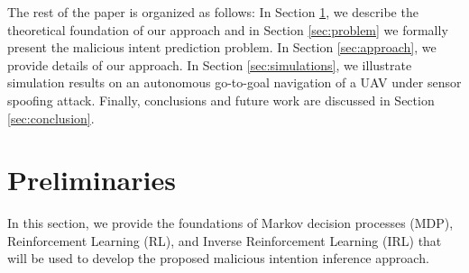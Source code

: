 \documentclass[letterpaper, 10 pt, conference]{ieeeconf}  %
\begin{document}
The rest of the paper is organized as follows: In Section \ref{sec:Preliminaries}, we describe the theoretical foundation of our approach and in Section \ref{sec:problem} we formally present the malicious intent prediction problem. In Section \ref{sec:approach}, we provide details of our approach. In Section \ref{sec:simulations}, we illustrate simulation results on an autonomous go-to-goal navigation of a UAV under sensor spoofing attack. Finally, conclusions and future work are discussed in Section \ref{sec:conclusion}.

\section{Preliminaries}\label{sec:Preliminaries}
In this section, we provide the foundations of Markov decision processes (MDP), Reinforcement Learning (RL), and Inverse Reinforcement Learning (IRL) that will be used to develop the proposed malicious intention inference approach.
\end{document}
